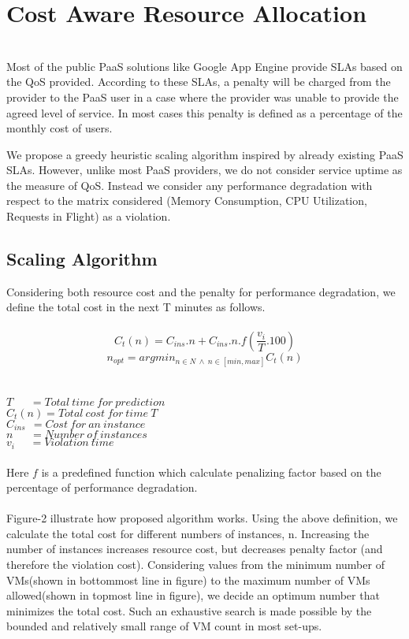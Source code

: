 \section{Cost Aware Resource Allocation}\\
Most of the public PaaS solutions like Google App Engine provide SLAs based on the QoS provided. According to these SLAs, a penalty will be charged from the provider to the PaaS user in a case where the provider was unable to provide the agreed level of service. In most cases this penalty is defined as a percentage of the monthly cost of users.

We propose a greedy heuristic scaling algorithm inspired by already existing PaaS SLAs. However, unlike most PaaS providers, we do not consider service uptime as the measure of QoS. Instead we consider any performance degradation with respect to the matrix considered (Memory Consumption, CPU Utilization, Requests in Flight) as a violation.

\subsection{Scaling Algorithm}
Considering both resource cost and the penalty for performance degradation, we define the total cost in the next T minutes as follows.\\
\\
\textbf{$$ C_t(n) = C_{ins}.n  + C_{ins} . n . f(\frac{v_i}{T}.100) $$}
\textbf{$$n_{opt} = argmin_{n \in N \ \land \ n \in [min, max]}C_t(n)$$} \\
\\
$T\ \ \ \ \ \ \ = Total\ time\ for\ prediction $ \\
$C_t(n)  = Total\ cost\ for\ time\ T $ \\
$C_{ins}\ \ = Cost\ for\ an\ instance$   \\
$n\ \ \ \ \ \ \       = Number\ of\ instances $  \\
$v_i\ \ \ \ \ \    = Violation\ time $ \\
\\
Here $f$ is a predefined function which calculate penalizing factor based on the percentage of performance degradation.\\
\\
Figure-2 illustrate how proposed algorithm works. Using the above definition, we calculate the total cost for different numbers of instances, n. Increasing the number of instances increases resource cost, but decreases penalty factor (and therefore the violation cost). Considering values from the minimum number of VMs(shown in bottommost line in figure) to the maximum number of VMs allowed(shown in topmost line in figure), we decide an optimum number that minimizes the total cost. Such an exhaustive search is made possible by the bounded and relatively small range of VM count in most set-ups.